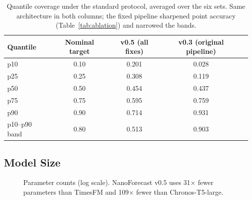 \documentclass[11pt]{article}
\begin{document}
\begin{table}[t]
\centering
\caption{Quantile coverage under the standard protocol, averaged over the six sets. Same architecture in both columns; the fixed pipeline sharpened point accuracy (Table~\ref{tab:ablation}) and narrowed the bands.}
\label{tab:calibration}
\small
\begin{tabular}{lcccc}
\toprule
Quantile & Nominal target & v0.5 (all fixes) & v0.3 (original pipeline) \\
\midrule
p10         & 0.10 & 0.201 & 0.028 \\
p25         & 0.25 & 0.308 & 0.119 \\
p50         & 0.50 & 0.454 & 0.437 \\
p75         & 0.75 & 0.595 & 0.759 \\
p90         & 0.90 & 0.714 & 0.931 \\
p10--p90 band & 0.80 & 0.513 & 0.903 \\
\bottomrule
\end{tabular}
\end{table}

\subsection{Model Size}

\begin{figure}[t]
\centering
{}
\caption{Parameter counts (log scale). NanoForecast v0.5 uses 31$\times$ fewer parameters than TimesFM and 109$\times$ fewer than Chronos-T5-large.}
\label{fig:params}
\end{figure}
\end{document}
